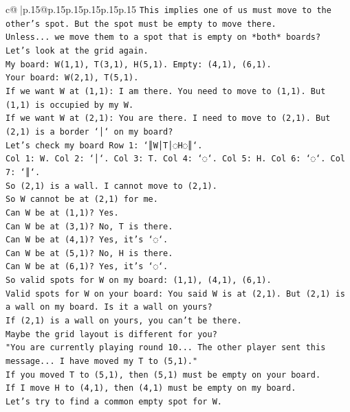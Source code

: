 \documentclass{article}
\begin{document}
{\begin{supertabular}{c@{$\;$}|p{.15\linewidth}@{}p{.15\linewidth}p{.15\linewidth}p{.15\linewidth}p{.15\linewidth}p{.15\linewidth}}
{{{\texttt{This implies one of us must move to the other's spot. But the spot must be empty to move there.} \\
\texttt{Unless... we move them to a spot that is empty on *both* boards?} \\
\texttt{Let's look at the grid again.} \\
\texttt{My board: W(1,1), T(3,1), H(5,1). Empty: (4,1), (6,1).} \\
\texttt{Your board: W(2,1), T(5,1).} \\
\texttt{If we want W at (1,1): I am there. You need to move to (1,1). But (1,1) is occupied by my W.} \\
\texttt{If we want W at (2,1): You are there. I need to move to (2,1). But (2,1) is a border `│` on my board?} \\
\texttt{Let's check my board Row 1: `║W│T│◌H◌║`.} \\
\texttt{Col 1: W. Col 2: `│`. Col 3: T. Col 4: `◌`. Col 5: H. Col 6: `◌`. Col 7: `║`.} \\
\texttt{So (2,1) is a wall. I cannot move to (2,1).} \\
\texttt{So W cannot be at (2,1) for me.} \\
\texttt{Can W be at (1,1)? Yes.} \\
\texttt{Can W be at (3,1)? No, T is there.} \\
\texttt{Can W be at (4,1)? Yes, it's `◌`.} \\
\texttt{Can W be at (5,1)? No, H is there.} \\
\texttt{Can W be at (6,1)? Yes, it's `◌`.} \\
\texttt{So valid spots for W on my board: (1,1), (4,1), (6,1).} \\
\texttt{Valid spots for W on your board: You said W is at (2,1). But (2,1) is a wall on my board. Is it a wall on yours?} \\
\texttt{If (2,1) is a wall on yours, you can't be there.} \\
\texttt{Maybe the grid layout is different for you?} \\
\texttt{"You are currently playing round 10... The other player sent this message... I have moved my T to (5,1)."} \\
\texttt{If you moved T to (5,1), then (5,1) must be empty on your board.} \\
\texttt{If I move H to (4,1), then (4,1) must be empty on my board.} \\
\texttt{Let's try to find a common empty spot for W.} \\
}}}
\end{supertabular}}
\end{document}
